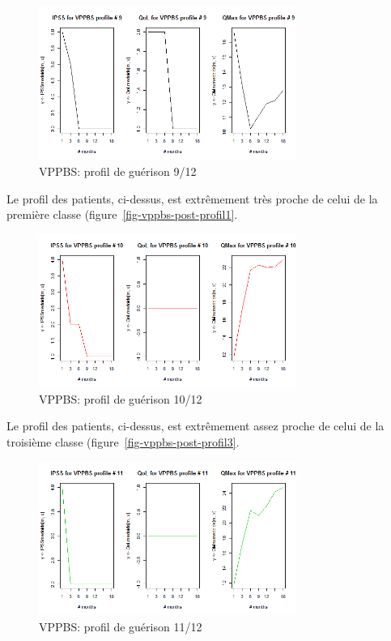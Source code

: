 \begin{figure}[H]
\centering
\includegraphics[width=0.75\textwidth]{../Fig/VPPBS/vppbs-profil-post-09.png}
\caption{VPPBS: profil de guérison 9/12}
\label{fig-vppbs-post-profil9}
\end{figure}

Le profil des patients, ci-dessus, est extrêmement très proche de celui de la première classe (figure~\ref{fig-vppbs-post-profil1}.

\begin{figure}[H]
\centering
\includegraphics[width=0.75\textwidth]{../Fig/VPPBS/vppbs-profil-post-10.png}
\caption{VPPBS: profil de guérison 10/12}
\label{fig-vppbs-post-profil10}
\end{figure}

Le profil des patients, ci-dessus, est extrêmement assez proche de celui de la troisième classe (figure~\ref{fig-vppbs-post-profil3}.

\begin{figure}[H]
\centering
\includegraphics[width=0.75\textwidth]{../Fig/VPPBS/vppbs-profil-post-11.png}
\caption{VPPBS: profil de guérison 11/12}
\label{fig-vppbs-post-profil11}
\end{figure}

